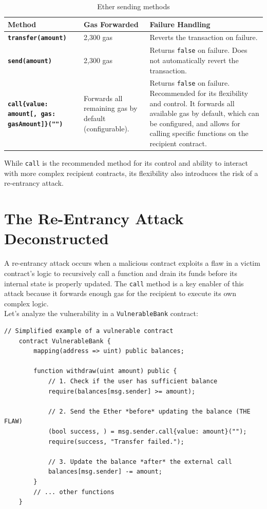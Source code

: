 \documentclass{scrbook}
\begin{document}
\begin{table}[h!]
    \centering
    \begin{tabular}{|p{}|p{}|p{}|}
        \hline
        Method & Gas Forwarded & Failure Handling \\ \hline
        
        \texttt{\textbf{transfer(amount)}} & 2,300 gas & Reverts the transaction on failure. \\ \hline
        
        \texttt{\textbf{send(amount)}} & 2,300 gas & Returns \texttt{false} on failure. Does not automatically revert the transaction. \\ \hline
        
        \texttt{\textbf{call\{value: amount[, gas: gasAmount]\}("")}} & Forwards all remaining gas by default (configurable). & Returns \texttt{false} on failure. Recommended for its flexibility and control. It forwards all available gas by default, which can be configured, and allows for calling specific functions on the recipient contract. \\ \hline
    \end{tabular}
    \caption{Ether sending methods}
    \label{lbl:ether_sending_methods}
\end{table}

While \texttt{call} is the recommended method for its control and ability to interact with more complex recipient contracts, its flexibility also introduces the risk of a re-entrancy attack.

\section{The Re-Entrancy Attack Deconstructed}

A re-entrancy attack occurs when a malicious contract exploits a flaw in a victim contract's logic to recursively call a function and drain its funds before its internal state is properly updated. The \texttt{call} method is a key enabler of this attack because it forwards enough gas for the recipient to execute its own complex logic.\\

Let's analyze the vulnerability in a \texttt{VulnerableBank} contract:

\begin{lstlisting}[caption={Vulnerable bank}]
    // Simplified example of a vulnerable contract
    contract VulnerableBank {
        mapping(address => uint) public balances;
    
        function withdraw(uint amount) public {
            // 1. Check if the user has sufficient balance
            require(balances[msg.sender] >= amount);
    
            // 2. Send the Ether *before* updating the balance (THE FLAW)
            (bool success, ) = msg.sender.call{value: amount}("");
            require(success, "Transfer failed.");
    
            // 3. Update the balance *after* the external call
            balances[msg.sender] -= amount;
        }
        // ... other functions
    }
\end{lstlisting}
\end{document}
